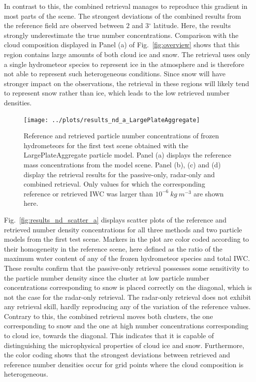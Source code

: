 \documentclass[journal abbreviation, manuscript]{copernicus}
\begin{document}
In contrast to this, the combined retrieval manages to reproduce this gradient
in most parts of the scene. The strongest deviations of the combined results
from the reference field are observed between $2$ and $3\unit{^\circ}$ latitude.
Here, the results strongly underestimate the true number concentrations.
Comparison with the cloud composition displayed in Panel (a) of
Fig.~\ref{fig:overview} shows that this region contains large amounts of both
cloud ice and snow. The retrieval uses only a single hydrometeor species to
represent ice in the atmosphere and is therefore not able to represent such
heterogeneous conditions. Since snow will have stronger impact on the
observations, the retrieval in these regions will likely tend to represent snow
rather than ice, which leads to the low retrieved number densities.

\begin{figure}
\centering
\texttt{[image: ../plots/results\_nd\_a\_LargePlateAggregate]}
\caption{Reference and retrieved particle number concentrations of frozen
  hydrometeors for the first test scene obtained with the LargePlateAggregate
  particle model. Panel (a) displays the reference mass concentrations from the
  model scene. Panel (b), (c) and (d) display the retrieval results for the
  passive-only, radar-only and combined retrieval. Only values for which the
  corresponding reference or retrieved IWC was larger than
  $10^{-6}\ \unit{kg\ m^{-3}}$ are shown here.}
\label{fig:results_nd_a}
\end{figure}

Fig.~\ref{fig:results_nd_scatter_a} displays scatter plots of the reference and
retrieved number density concentrations for all three methods and two particle
models from the first test scene. Markers in the plot are color coded according
to their homogeneity in the reference scene, here defined as the ratio of the
maximum water content of any of the frozen hydrometeor species and total IWC.
These results confirm that the passive-only retrieval possesses some sensitivity
to the particle number density since the cluster at low particle number
concentrations corresponding to snow is placed correctly on the diagonal, which
is not the case for the radar-only retrieval. The radar-only retrieval does not
exhibit any retrieval skill, hardly reproducing any of the variation of the
reference values. Contrary to this, the combined retrieval moves both clusters,
the one corresponding to snow and the one at high number concentrations
corresponding to cloud ice, towards the diagonal. This indicates that it is
capable of distinguishing the microphysical properties of cloud ice and snow.
Furthermore, the color coding shows that the strongest deviations between
retrieved and reference number densities occur for grid points where the cloud
composition is heterogeneous. 
\end{document}
